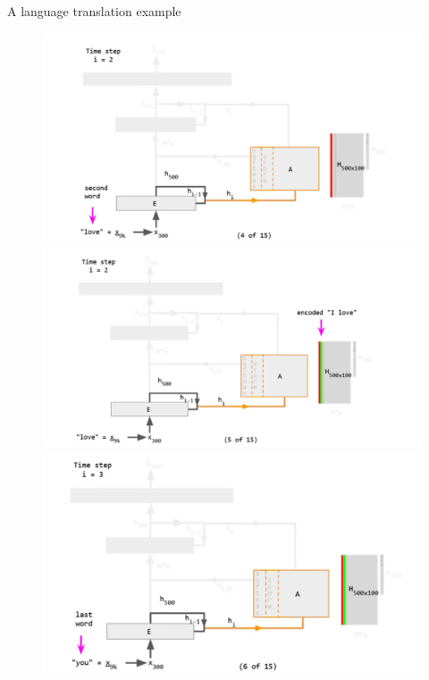 \documentclass[
  notheorems,
  aspectratio=54,
]{beamer}
\begin{document}
\begin{frame}{A language translation example}
\begin{figure}
  \begin{minipage}[b]{0.4\textwidth}
    \par\medskip
    \includegraphics[width=1.3\textwidth]{./translation/4.jpg}
  \end{minipage}
  \hfill
  \begin{minipage}[b]{0.4\textwidth}
    \par\medskip
    \includegraphics[width=1.3\textwidth]{./translation/5.jpg}
  \end{minipage}
  \begin{minipage}[b]{0.4\textwidth}
    \par\medskip
    \includegraphics[width=1.3\textwidth]{./translation/6.jpg}
  \end{minipage}
\end{figure}
\end{frame}
\end{document}
